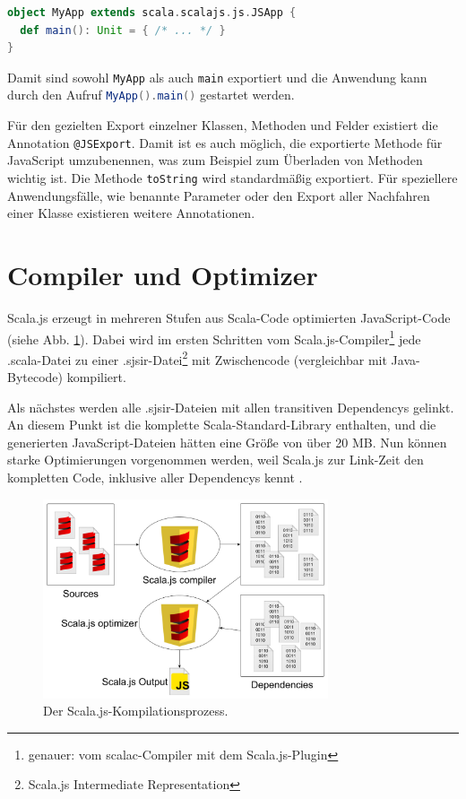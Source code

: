 \documentclass[a4paper, 12pt, hidelinks, listof=totoc, listoftables=totoc, bibliography=totoc]{scrreprt}
\newcommand{\scala}[1]{\lstinline[language=Scala, style=inline]|#1|}
\begin{document}
\begin{lstlisting}[language=Scala, style=snippet]
object MyApp extends scala.scalajs.js.JSApp {
  def main(): Unit = { /* ... */ }
}
\end{lstlisting}

Damit sind sowohl \scala{MyApp} als auch \scala{main} exportiert und die Anwendung kann durch den Aufruf \scala{MyApp().main()} gestartet werden.

Für den gezielten Export einzelner Klassen, Methoden und Felder existiert die Annotation \scala{@JSExport}. Damit ist es auch möglich, die exportierte Methode für JavaScript umzubenennen, was zum Beispiel zum Überladen von Methoden wichtig ist. Die Methode \scala{toString} wird standardmäßig exportiert. Für speziellere Anwendungsfälle, wie benannte Parameter oder den Export aller Nachfahren einer Klasse existieren weitere Annotationen. \cite{scalajs.DEJ}



\section{Compiler und Optimizer}\label{sec:compiler}

Scala.js erzeugt in mehreren Stufen aus Scala-Code optimierten JavaScript-Code (siehe Abb. \ref{fig:sjs-compilation}). Dabei wird im ersten Schritten vom Scala.js-Compiler\footnote{genauer: vom scalac-Compiler mit dem Scala.js-Plugin} jede .scala-Datei zu einer .sjsir-Datei\footnote{Scala.js Intermediate Representation} mit Zwischencode (vergleichbar mit Java-Bytecode) kompiliert.

Als nächstes werden alle .sjsir-Dateien mit allen transitiven Dependencys gelinkt. An diesem Punkt ist die komplette Scala-Standard-Library enthalten, und die generierten JavaScript-Dateien hätten eine Größe von über 20 MB. Nun können starke Optimierungen vorgenommen werden, weil Scala.js zur Link-Zeit den kompletten Code, inklusive aller Dependencys kennt \cite[Folie 45 ff., Min. 36]{doeraene2015.SSP}.

\begin{figure}[!h]
    \centering
    \includegraphics[width=0.75\textwidth]{Doeraene2014-Scalajs-p17}
    \caption[Der Scala.js-Kompilationsprozess]{Der Scala.js-Kompilationsprozess. \cite[Folie 17]{doeraene2014.WHB}}
    \label{fig:sjs-compilation}
\end{figure}
\end{document}
